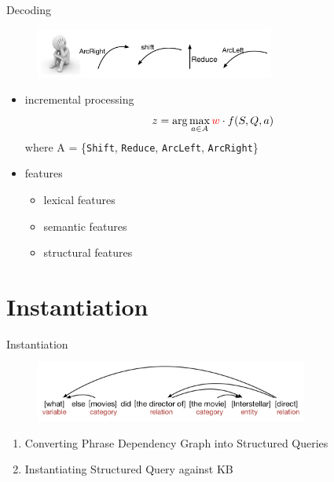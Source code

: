 \documentclass{beamer}
\begin{document}
\begin{frame}{Decoding}
	\begin{figure}
	\centering\includegraphics[width=0.7\textwidth]{introduction/parsing_decode.pdf}
	\end{figure}
	\begin{itemize}
		\item incremental processing
			\begin{displaymath}
			z = \arg \max_{a \in A} \textcolor{red}{w} \cdot f(S, Q, a)
			\end{displaymath}
			\small where A = \{\texttt{Shift}, \texttt{Reduce}, \texttt{ArcLeft}, \texttt{ArcRight}\}
		\item features
			\begin{itemize}
				\item lexical features
				\item semantic features
				\item structural features
			\end{itemize}
	\end{itemize}

\end{frame}

\section{Instantiation}
\begin{frame}{Instantiation}
	\begin{figure}
		\centering\includegraphics[width=0.8\textwidth]{introduction/DAG.pdf}
	\end{figure}
  	\begin{enumerate}
		\item \small Converting Phrase Dependency Graph into Structured Queries
		\item Instantiating Structured Query against KB
	\end{enumerate}
\end{frame}
\end{document}
